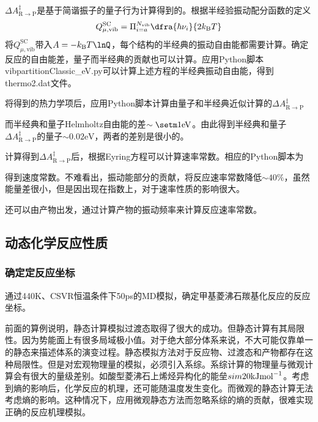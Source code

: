 $\Delta A_{\mathrm{R}\rightarrow\mathrm{P}}^{\ddagger}$是基于简谐振子的量子行为计算得到的。根据半经验振动配分函数的定义
\begin{displaymath}
	Q_{\mu,\mathrm{vib}}^{\mathrm{SC}}=\Pi_{i=a}^{N_{\mathrm{vib}}}\dfra{\hbar\nu_i}{2k_{\mathrm{B}}T}
\end{displaymath}
将$Q_{\mu,\mathrm{vib}}^{\mathrm{SC}}$带入$A=-k_{\mathrm{B}}T\lnQ$，每个结构的半经典的振动自由能都需要计算。确定反应的自由能差，量子而半经典的贡献也可以计算。应用\textrm{Python}脚本\textrm{vibpartitionClassic\_eV.py}可以计算上述方程的半经典振动自由能，得到\textrm{thermo2.dat}文件。

将得到的热力学项后，应用\textrm{Python}脚本计算由量子和半经典近似计算的$\Delta A_{\mathrm{R}\rightarrow\mathrm{P}}^{\ddagger}$

而半经典和量子\textrm{Helmholtz}自由能的差$\sim\setm1\mathrm{eV}$。由此得到半经典和量子$\Delta A_{\mathrm{R}\rightarrow\mathrm{P}}^{\ddagger}$的量子$\sim0.02\mathrm{eV}$，两者的差别是很小的。

计算得到$\Delta A_{\mathrm{R}\rightarrow\mathrm{P}}^{\ddagger}$后，根据\textrm{Eyring}方程可以计算速率常数。相应的\textrm{Python}脚本为

得到速度常数。不难看出，振动能部分的贡献，将反应速率常数降低$\sim40\%$，虽然能量差很小，但是因出现在指数上，对于速率性质的影响很大。

还可以由产物出发，通过计算产物的振动频率来计算反应速率常数。

\subsection{动态化学反应性质}
\subsubsection{确定定反应坐标}
通过\textrm{440K}、\textrm{CSVR}恒温条件下\textrm{50ps}的\textrm{MD}模拟，确定甲基菱沸石羰基化反应的反应坐标。

前面的算例说明，静态计算模拟过渡态取得了很大的成功。但静态计算有其局限性。因为势能面上有很多局域极小值。对于绝大部分体系来说，不大可能仅靠单一的静态来描述体系的演变过程。静态模拟方法对于反应物、过渡态和产物都存在这种局限性。但是对宏观物理量的模拟，必须引入系综。系综计算的物理量与微观计算会有很大的量级差别。如酸型菱沸石上烯烃异构化的能垒$\\sim20\mathrm{kJmol}^{-1}$。考虑到熵的影响后，化学反应的机理，还可能随温度发生变化。而微观的静态计算无法考虑熵的影响。这种情况下，应用微观静态方法而忽略系综的熵的贡献，很难实现正确的反应机理模拟。

